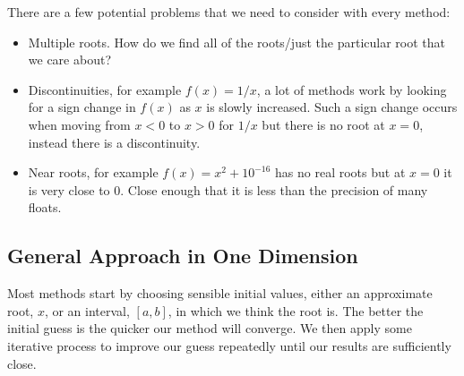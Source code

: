 \documentclass[a4paper]{article}
\begin{document}
    There are a few potential problems that we need to consider with every method:
    \begin{itemize}
        \item Multiple roots. 
        How do we find all of the roots/just the particular root that we care about?
        \item Discontinuities, for example \(f(x) = 1/x\), a lot of methods work by looking for a sign change in \(f(x)\) as \(x\) is slowly increased.
        Such a sign change occurs when moving from \(x < 0\) to \(x > 0\) for \(1/x\) but there is no root at \(x = 0\), instead there is a discontinuity.
        \item Near roots, for example \(f(x) = x^2 + 10^{-16}\) has no real roots but at \(x = 0\) it is very close to 0.
        Close enough that it is less than the precision of many floats.
    \end{itemize}
    
    \subsection{General Approach in One Dimension}
    Most methods start by choosing sensible initial values, either an approximate root, \(x\), or an interval, \([a, b]\), in which we think the root is.
    The better the initial guess is the quicker our method will converge.
    We then apply some iterative process to improve our guess repeatedly until our results are sufficiently close.
    
\end{document}
